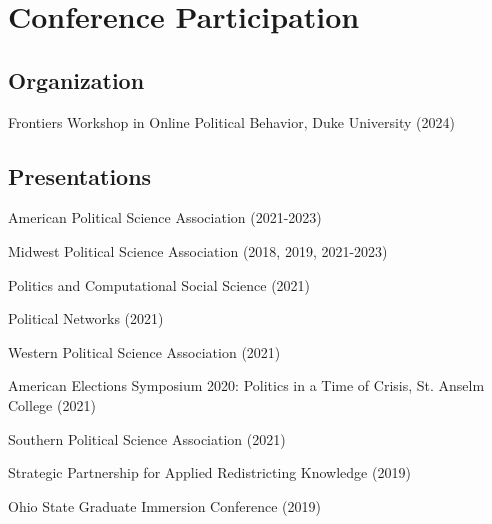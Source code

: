 \documentclass[letterpaper]{article}
\renewenvironment{itemize}{
  \begin{list}{}{
    \setlength{\leftmargin}{1.5em}
  }
}{
  \end{list}
}
\begin{document}
\section*{Conference Participation}

\subsection*{Organization}

\begin{itemize}
\item Frontiers Workshop in Online Political Behavior, Duke University (2024) 
\end{itemize}

\subsection*{Presentations}
\begin{itemize}

\item American Political Science Association (2021-2023)

\item Midwest Political Science Association (2018, 2019, 2021-2023)

\item Politics and Computational Social Science (2021)

\item Political Networks (2021)

\item Western Political Science Association (2021)

\item American Elections Symposium 2020: Politics in a Time of Crisis, St. Anselm College (2021)

\item Southern Political Science Association (2021)

\item Strategic Partnership for Applied Redistricting Knowledge (2019)

\item Ohio State Graduate Immersion Conference (2019)
\end{itemize}
\end{document}
